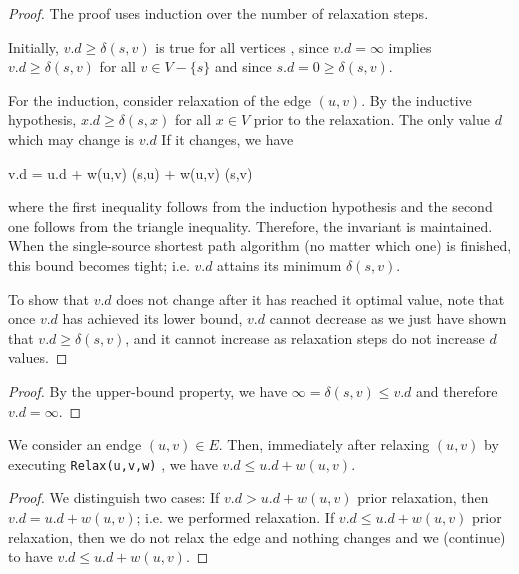 \begin{proof}
  The proof uses induction over the number of relaxation steps.

  Initially, $v.d \geq \delta(s,v)$ is true for all vertices , since $v.d = \infty$ implies $v.d \geq \delta(s,v)$ for all $v \in V - \{s\}$ and since $s.d=0 \geq \delta(s,v)$.

  For the induction, consider relaxation of the edge $(u,v)$. By the inductive hypothesis, $x.d \geq \delta(s,x)$ for  all $x \in V$ prior to the relaxation. The only value $d$ which may change is $v.d$ If it changes, we have

  \bee
    v.d = u.d + w(u,v) \geq \delta(s,u) + w(u,v) \geq \delta(s,v)
  \eee

  where the first inequality follows from the induction hypothesis and the second one follows from the triangle inequality. Therefore, the invariant is maintained. When the single-source shortest path algorithm (no matter which one) is finished, this bound becomes tight; i.e. $v.d$ attains its minimum $\delta(s,v)$.

  To show that $v.d$ does not change after it has reached it optimal value, note that once $v.d$ has achieved its lower bound, $v.d$ cannot decrease as we just have shown that $v.d \geq \delta(s,v)$, and it cannot increase as relaxation steps do not increase $d$ values. 

\end{proof}


\begin{proof}
By the upper-bound property, we have $\infty = \delta(s,v) \leq v.d$ and therefore $v.d = \infty$.
\end{proof}


\begin{theorem}
  We consider an endge $(u,v) \in E$. Then, immediately after relaxing $(u,v)$ by executing \verb|Relax(u,v,w)| , we have $v.d  \leq u.d + w(u,v)$.
\end{theorem}

\begin{proof}
  We distinguish two cases: If $v.d > u.d + w(u,v)$ prior relaxation, then $v.d = u.d + w(u,v)$; i.e. we performed relaxation. If $v.d \leq u.d + w(u,v)$ prior relaxation, then we do not relax the edge and nothing changes and we (continue) to have $v.d \leq u.d + w(u,v)$.
\end{proof}


